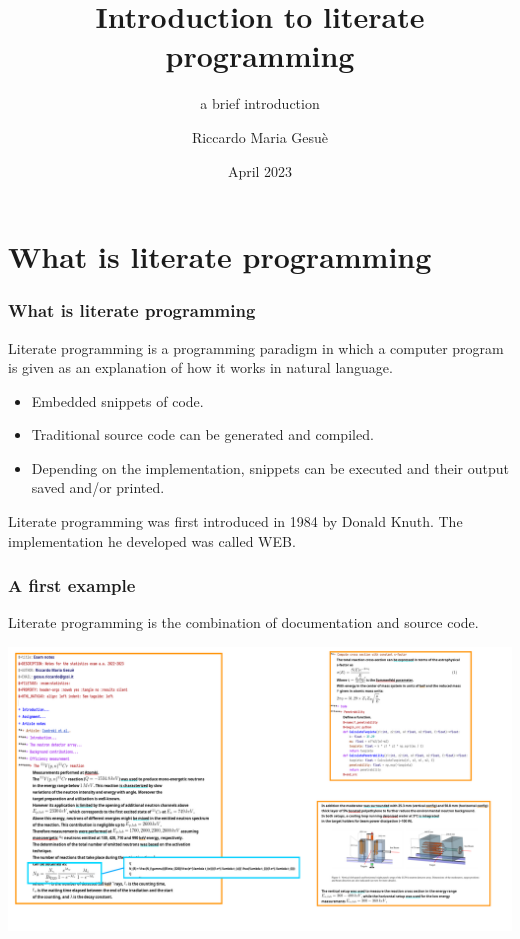 \documentclass{Gesue_PresentationTemplate}
\title{Introduction to literate programming}
\subtitle{a brief introduction}
\date{April 2023}
\author{Riccardo Maria Gesuè}
\institute{Fellowship Of Clean Code}
\begin{document}
\maketitle
\section{What is literate programming}
\begin{frame}
  \frametitle{What is literate programming}
  \begin{block}{}
    Literate programming is a
    \alert{programming paradigm}
    in which a computer program is given
    as an explanation of how it works in
    \alert{natural language}.
  \end{block}
  \begin{itemize}
    \item \alert{Embedded} snippets of code.
    \item Traditional source code can be
          \alert{generated and compiled}.
    \item Depending on the implementation,
          snippets can be \alert{executed} and their
          output saved and/or printed.
  \end{itemize}
  Literate programming was first introduced in
  1984 by Donald Knuth\cite{knuthliterate}.
  The implementation
  he developed was called WEB\cite{WEB}.
\end{frame}
\begin{frame}
  \frametitle{A first example}
  \begin{block}{}
    Literate programming is the combination of
    documentation and source code.
  \end{block}
  \centering
  \includegraphics[width = .8\linewidth]{Images/example.pdf}
\end{frame}
\end{document}
